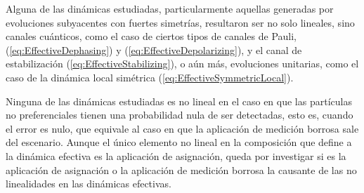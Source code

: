 Alguna de las dinámicas estudiadas, particularmente aquellas generadas por evoluciones subyacentes con fuertes simetrías, resultaron ser no solo lineales, sino canales cuánticos, como el caso de ciertos tipos de canales de Pauli, (\ref{eq:EffectiveDephasing}) y (\ref{eq:EffectiveDepolarizing}), y el canal de estabilización (\ref{eq:EffectiveStabilizing}), o aún más, evoluciones unitarias, como el caso de la dinámica local simétrica (\ref{eq:EffectiveSymmetricLocal}). 

Ninguna de las dinámicas estudiadas es no lineal en el caso en que las partículas no preferenciales tienen una probabilidad nula de ser detectadas, esto es, cuando el error es nulo, que equivale al caso en que la aplicación de medición borrosa sale del escenario. Aunque el único elemento no lineal en la composición que define a la dinámica efectiva es la aplicación de asignación, queda por investigar si es la aplicación de asignación o la aplicación de medición borrosa la causante de las no linealidades en las dinámicas efectivas.